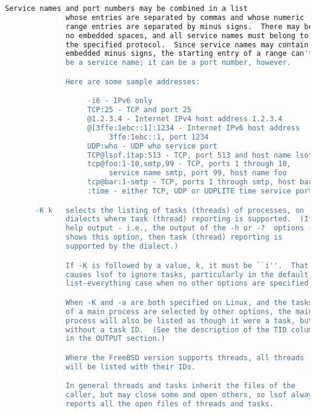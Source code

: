 {{\begin{lstlisting}[language=bash]
              Service names and port numbers may be combined in a list
              whose entries are separated by commas and whose numeric
              range entries are separated by minus signs.  There may be
              no embedded spaces, and all service names must belong to
              the specified protocol.  Since service names may contain
              embedded minus signs, the starting entry of a range can't
              be a service name; it can be a port number, however.

              Here are some sample addresses:

                   -i6 - IPv6 only
                   TCP:25 - TCP and port 25
                   @1.2.3.4 - Internet IPv4 host address 1.2.3.4
                   @[3ffe:1ebc::1]:1234 - Internet IPv6 host address
                        3ffe:1ebc::1, port 1234
                   UDP:who - UDP who service port
                   TCP@lsof.itap:513 - TCP, port 513 and host name lsof.itap
                   tcp@foo:1-10,smtp,99 - TCP, ports 1 through 10,
                        service name smtp, port 99, host name foo
                   tcp@bar:1-smtp - TCP, ports 1 through smtp, host bar
                   :time - either TCP, UDP or UDPLITE time service port

       -K k   selects the listing of tasks (threads) of processes, on
              dialects where task (thread) reporting is supported.  (If
              help output - i.e., the output of the -h or -?  options -
              shows this option, then task (thread) reporting is
              supported by the dialect.)

              If -K is followed by a value, k, it must be ``i''.  That
              causes lsof to ignore tasks, particularly in the default,
              list-everything case when no other options are specified.

              When -K and -a are both specified on Linux, and the tasks
              of a main process are selected by other options, the main
              process will also be listed as though it were a task, but
              without a task ID.  (See the description of the TID column
              in the OUTPUT section.)

              Where the FreeBSD version supports threads, all threads
              will be listed with their IDs.

              In general threads and tasks inherit the files of the
              caller, but may close some and open others, so lsof always
              reports all the open files of threads and tasks.


\end{lstlisting}}}
